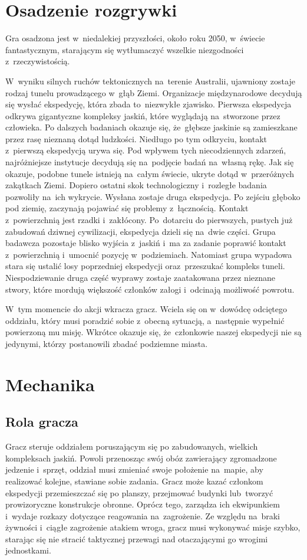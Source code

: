 \documentclass[licencjacka]{pracamgr}
\begin{document}
  \section{Osadzenie rozgrywki}
    Gra osadzona jest w~niedalekiej przyszłości, około roku 2050, w~świecie fantastycznym, starającym się wytłumaczyć
    wszelkie niezgodności z~rzeczywistością. 

    W~wyniku silnych ruchów tektonicznych na~terenie Australii, ujawniony zostaje rodzaj tunelu
    prowadzącego w~głąb Ziemi. Organizacje międzynarodowe decydują się wysłać ekspedycję, która zbada to~niezwykłe
    zjawisko. Pierwsza ekspedycja odkrywa gigantyczne kompleksy jaskiń, które wyglądają na~stworzone przez człowieka.
    Po dalszych badaniach okazuje się, że~głębsze jaskinie są zamieszkane przez rasę nieznaną dotąd ludzkości. Niedługo
    po tym odkryciu, kontakt z~pierwszą ekspedycją urywa się. Pod wpływem tych niecodziennych zdarzeń, najróżniejsze
    instytucje decydują się na~podjęcie badań na~własną rękę. Jak się okazuje, podobne tunele istnieją na~całym świecie,
    ukryte dotąd w~przeróżnych zakątkach Ziemi. Dopiero ostatni skok technologiczny i~rozległe badania pozwoliły na~ich 
    wykrycie. Wysłana zostaje druga ekspedycja. Po zejściu głęboko pod ziemię, zaczynają pojawiać się problemy z~łącznością.
    Kontakt z~powierzchnią jest rzadki i~zakłócony. Po~dotarciu do pierwszych, pustych już zabudowań dziwnej cywilizacji,
    ekspedycja dzieli się na~dwie części. Grupa badawcza pozostaje blisko wyjścia z~jaskiń i~ma za zadanie poprawić
    kontakt z~powierzchnią i~umocnić pozycję w~podziemiach. Natomiast grupa wypadowa stara się ustalić losy poprzedniej
    ekspedycji oraz~przeszukać kompleks tuneli. Niespodziewanie druga część wyprawy zostaje zaatakowana przez nieznane stwory,
    które mordują większość członków załogi i~odcinają możliwość powrotu.

    W~tym momencie do akcji wkracza gracz. Wciela się on w~dowódcę odciętego oddziału, który musi poradzić sobie z~obecną
    sytuacją, a~następnie wypełnić powierzoną mu misję. Wkrótce okazuje się, że~członkowie naszej ekspedycji nie są jedynymi,
    którzy postanowili zbadać podziemne miasta.

  \section{Mechanika}
    \subsection{Rola gracza}
      Gracz steruje oddziałem poruszającym się po zabudowanych, wielkich kompleksach jaskiń. Powoli przenosząc swój obóz zawierający
      zgromadzone jedzenie i~sprzęt, oddział musi zmieniać swoje położenie na~mapie, aby realizować kolejne, stawiane sobie zadania.
      Gracz może kazać członkom ekspedycji przemieszczać się po planszy, przejmować budynki lub~tworzyć prowizoryczne konstrukcje obronne.
      Oprócz tego, zarządza ich ekwipunkiem i~wydaje rozkazy dotyczące reagowania na~zagrożenie. Ze względu na~braki żywności
      i~ciągłe zagrożenie atakiem wroga, gracz musi wykonywać misje szybko, starając się nie stracić taktycznej przewagi nad
      otaczającymi go wrogimi jednostkami.
\end{document}
